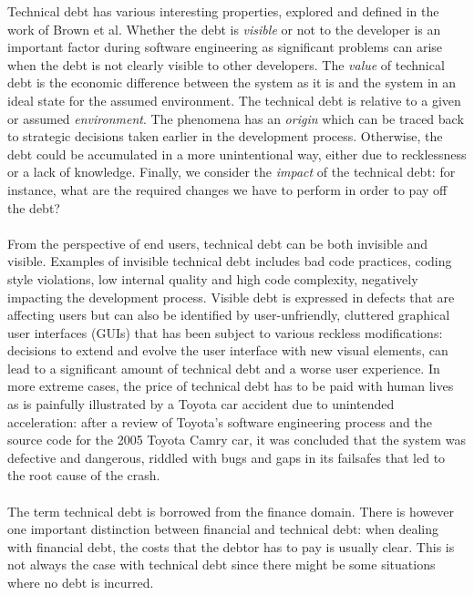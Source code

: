 \noindent Technical debt has various interesting properties, explored and defined in the work of Brown et al\cite{brown2010managing}. 
Whether the debt is \emph{visible} or not to the developer is an important factor during software engineering as significant problems can arise when the debt is not clearly visible to other developers.
The \emph{value} of technical debt is the economic difference between the system as it is and the system in an ideal state for the assumed environment.
The technical debt is relative to a given or assumed \emph{environment}.
The phenomena has an \emph{origin} which can be traced back to strategic decisions taken earlier in the development process. Otherwise, the debt could be accumulated in a more unintentional way, either due to recklessness or a lack of knowledge.
Finally, we consider the \emph{impact} of the technical debt: for instance, what are the required changes we have to perform in order to pay off the debt?\\\\
From the perspective of end users, technical debt can be both invisible and visible\cite{kruchten2012technical}.
Examples of invisible technical debt includes bad code practices, coding style violations, low internal quality and high code complexity, negatively impacting the development process.
Visible debt is expressed in defects that are affecting users but can also be identified by user-unfriendly, cluttered graphical user interfaces (GUIs) that has been subject to various reckless modifications: decisions to extend and evolve the user interface with new visual elements, can lead to a significant amount of technical debt and a worse user experience.
In more extreme cases, the price of technical debt has to be paid with human lives as is painfully illustrated by a Toyota car accident due to unintended acceleration: after a review of Toyota’s software engineering process and the source code for the 2005 Toyota Camry car, it was concluded that the system was defective and dangerous, riddled with bugs and gaps in its failsafes that led to the root cause of the crash\cite{toyotatechnicaldebt}.\\\\
The term technical debt is borrowed from the finance domain\cite{guo2011portfolio}.
There is however one important distinction between financial and technical debt: when dealing with financial debt, the costs that the debtor has to pay is usually clear.
This is not always the case with technical debt since there might be some situations where no debt is incurred.
